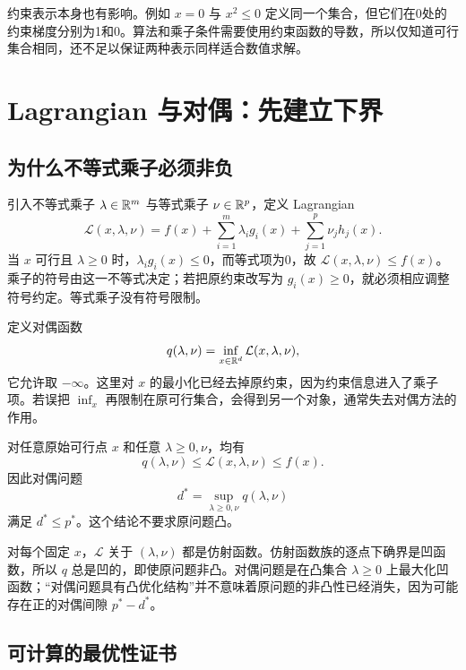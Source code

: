 约束表示本身也有影响。例如 $x=0$ 与 $x^2\leq0$ 定义同一个集合，但它们在0处的约束梯度分别为1和0。算法和乘子条件需要使用约束函数的导数，所以仅知道可行集合相同，还不足以保证两种表示同样适合数值求解。

\section{Lagrangian 与对偶：先建立下界}
\label{l2:duality}

\subsection{为什么不等式乘子必须非负}

引入不等式乘子 $\lambda\in\mathbb R^m$ 与等式乘子 $\nu\in\mathbb R^p$，定义 Lagrangian
\begin{equation}
 \mathcal L(x,\lambda,\nu)
 =f(x)+\sum_{i=1}^m\lambda_i g_i(x)
       +\sum_{j=1}^p\nu_jh_j(x).
 \label{l2:lagrangian}
\end{equation}
当 $x$ 可行且 $\lambda\geq0$ 时，$\lambda_i g_i(x)\leq0$，而等式项为0，故 $\mathcal L(x,\lambda,\nu)\leq f(x)$。乘子的符号由这一不等式决定；若把原约束改写为 $g_i(x)\geq0$，就必须相应调整符号约定。等式乘子没有符号限制。

定义对偶函数
\begin{equation}
 q(\lambda,\nu)=\inf_{x\in\mathbb R^d}\mathcal L(x,\lambda,\nu),
 \label{l2:dual-function}
\end{equation}
它允许取 $-\infty$。这里对 $x$ 的最小化已经去掉原约束，因为约束信息进入了乘子项。若误把 $\inf_x$ 再限制在原可行集合，会得到另一个对象，通常失去对偶方法的作用。

\begin{proposition}[弱对偶]
\label{l2:prop-weak-duality}
对任意原始可行点 $x$ 和任意 $\lambda\geq0,\nu$，均有
\[
 q(\lambda,\nu)\leq\mathcal L(x,\lambda,\nu)\leq f(x).
\]
因此对偶问题
\begin{equation}
 d^*=\sup_{\lambda\geq0,\nu}q(\lambda,\nu)
 \label{l2:dual-problem}
\end{equation}
满足 $d^*\leq p^*$。这个结论不要求原问题凸。
\end{proposition}

对每个固定 $x$，$\mathcal L$ 关于 $(\lambda,\nu)$ 都是仿射函数。仿射函数族的逐点下确界是凹函数，所以 $q$ 总是凹的，即使原问题非凸。对偶问题是在凸集合 $\lambda\geq0$ 上最大化凹函数；“对偶问题具有凸优化结构”并不意味着原问题的非凸性已经消失，因为可能存在正的对偶间隙 $p^*-d^*$。

\subsection{可计算的最优性证书}

